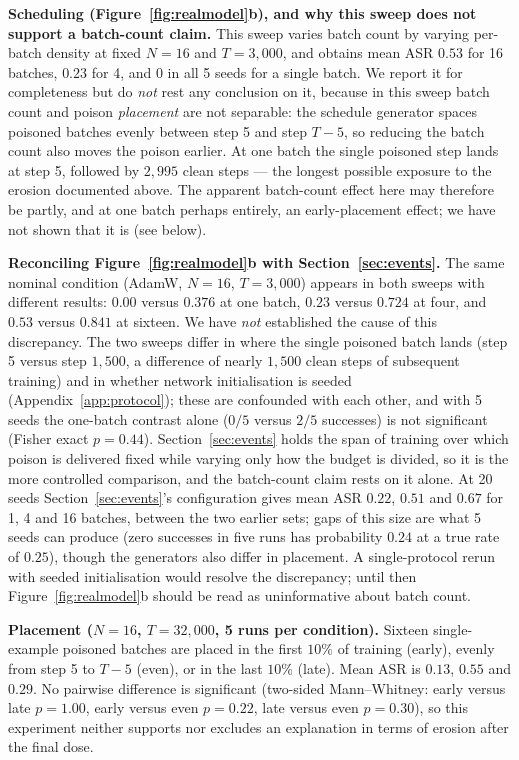 \documentclass{article} %
\begin{document}
\textbf{Scheduling (Figure~\ref{fig:realmodel}b), and why this sweep does not support a
batch-count claim.} This sweep varies batch count by varying per-batch density at fixed
$N=16$ and $T=3{,}000$, and obtains mean ASR $0.53$ for 16 batches, $0.23$ for 4, and
$0$ in all 5 seeds for a single batch. We report it for completeness but do \emph{not}
rest any conclusion on it, because in this sweep batch count and poison \emph{placement}
are not separable: the schedule generator spaces poisoned batches evenly between step 5
and step $T-5$, so reducing the batch count also moves the poison earlier. At one batch
the single poisoned step lands at step 5, followed by $2{,}995$ clean steps --- the
longest possible exposure to the erosion documented above. The apparent batch-count effect here may therefore be partly, and at one batch perhaps entirely, an early-placement effect; we have not shown that it is (see below).

\textbf{Reconciling Figure~\ref{fig:realmodel}b with Section~\ref{sec:events}.} The same
nominal condition (AdamW, $N=16$, $T=3{,}000$) appears in both sweeps with different
results: $0.00$ versus $0.376$ at one batch, $0.23$ versus $0.724$ at four, and $0.53$
versus $0.841$ at sixteen. We have \emph{not} established the cause of this discrepancy. The two sweeps differ in where the single poisoned batch lands (step 5 versus step $1{,}500$, a difference of nearly $1{,}500$ clean steps of subsequent training) and in whether network initialisation is seeded (Appendix~\ref{app:protocol}); these are confounded with each other, and with 5 seeds the one-batch contrast alone ($0/5$ versus $2/5$ successes) is not significant (Fisher exact $p=0.44$). Section~\ref{sec:events} holds the span of training over which poison is delivered fixed while varying only how the budget is divided, so it is the more controlled comparison, and the batch-count claim rests on it alone. At 20 seeds Section~\ref{sec:events}'s configuration gives mean ASR $0.22$, $0.51$ and $0.67$ for 1, 4 and 16 batches, between the two earlier sets; gaps of this size are what 5 seeds can produce (zero successes in five runs has probability $0.24$ at a true rate of $0.25$), though the generators also differ in placement. A single-protocol rerun with seeded initialisation would resolve the discrepancy; until then Figure~\ref{fig:realmodel}b should be read as uninformative about batch count.

\textbf{Placement ($N=16$, $T=32{,}000$, 5 runs per condition).} Sixteen single-example poisoned batches are placed in the first $10\%$ of training (early), evenly from step 5 to $T-5$ (even), or in the last $10\%$ (late). Mean ASR is $0.13$, $0.55$ and $0.29$. No pairwise difference is significant (two-sided Mann--Whitney: early versus late $p=1.00$, early versus even $p=0.22$, late versus even $p=0.30$), so this experiment neither supports nor excludes an explanation in terms of erosion after the final dose.
\end{document}
